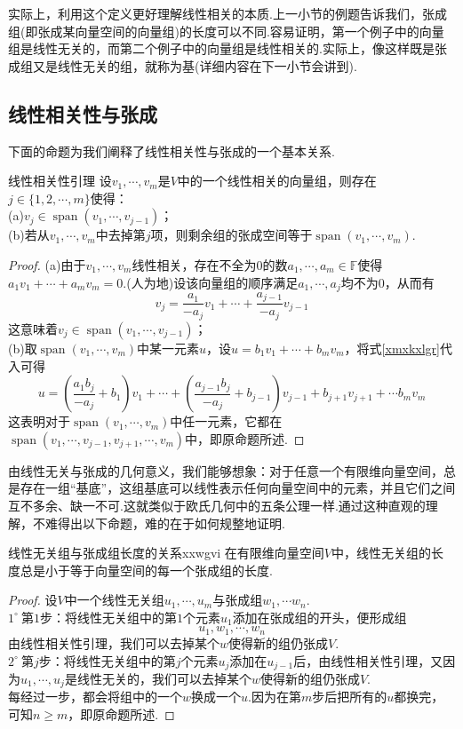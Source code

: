 \documentclass[lang=cn, zihao=5]{elegantbook}
\newcommand{\ssb}[1]{\left( #1 \right)}
\newcommand{\F}{\mathbb{F}}
\newcommand{\buzhou}[1]{$#1^{\circ} \ $}
\DeclareMathOperator{\spn}{span}
\begin{document}
实际上，利用这个定义更好理解线性相关的本质.上一小节的例题告诉我们，张成组(即张成某向量空间的向量组)的长度可以不同.容易证明，第一个例子中的向量组是线性无关的，而第二个例子中的向量组是线性相关的.实际上，像这样既是张成组又是线性无关的组，就称为基(详细内容在下一小节会讲到).


\subsection{线性相关性与张成}

下面的命题为我们阐释了线性相关性与张成的一个基本关系.

\begin{proposition}{线性相关性引理}
	设$v_1, \cdots ,v_m$是$V$中的一个线性相关的向量组，则存在$j \in \{ 1,2, \cdots ,m \}$使得： \\
	(a)$v_j \in \spn (v_1, \cdots , v_{j-1})$； \\
	(b)若从$v_1, \cdots ,v_m$中去掉第$j$项，则剩余组的张成空间等于$\spn (v_1, \cdots ,v_m)$.
\end{proposition}
\begin{proof}
	(a)由于$v_1, \cdots ,v_m$线性相关，存在不全为$0$的数$a_1, \cdots ,a_m \in \F$使得$a_1v_1 + \cdots + a_mv_m = 0$.(人为地)设该向量组的顺序满足$a_1, \cdots ,a_j$均不为$0$，从而有
	\begin{equation}
		v_j = \frac{a_1}{-a_j} v_1 + \cdots + \frac{a_{j-1}}{-a_j} v_{j-1} \label{xmxkxlgr}
	\end{equation}
	这意味着$v_j \in \spn (v_1, \cdots , v_{j-1})$； \\
	(b)取$\spn (v_1, \cdots ,v_m)$中某一元素$u$，设$u=b_1v_1 + \cdots + b_mv_m$，将式\ref{xmxkxlgr}代入可得
	$$u = \ssb{\frac{a_1b_j}{-a_j}+b_1}v_1 + \cdots + \ssb{\frac{a_{j-1}b_j}{-a_j}+b_{j-1}}v_{j-1} + b_{j+1} v_{j+1} + \cdots b_mv_m$$
	这表明对于$\spn (v_1, \cdots ,v_m)$中任一元素，它都在$\spn (v_1, \cdots ,v_{j-1} , v_{j+1}, \cdots ,v_m)$中，即原命题所述.
\end{proof}

由线性无关与张成的几何意义，我们能够想象：对于任意一个有限维向量空间，总是存在一组“基底”，这组基底可以线性表示任何向量空间中的元素，并且它们之间互不多余、缺一不可.这就类似于欧氏几何中的五条公理一样.通过这种直观的理解，不难得出以下命题，难的在于如何规整地证明.

\begin{proposition}{线性无关组与张成组长度的关系}{xxwgvi}
	在有限维向量空间$V$中，线性无关组的长度总是小于等于向量空间的每一个张成组的长度.
\end{proposition}
\begin{proof}
	设$V$中一个线性无关组$u_1, \cdots ,u_m$与张成组$w_1, \cdots w_n$. \\
	\buzhou{1}第$1$步：将线性无关组中的第$1$个元素$u_1$添加在张成组的开头，便形成组$$u_1,w_1, \cdots ,w_n$$
	由线性相关性引理，我们可以去掉某个$w$使得新的组仍张成$V$. \\
	\buzhou{2}第$j$步：将线性无关组中的第$j$个元素$u_j$添加在$u_{j-1}$后，由线性相关性引理，又因为$u_1, \cdots ,u_j$是线性无关的，我们可以去掉某个$w$使得新的组仍张成$V$. \\
	每经过一步，都会将组中的一个$w$换成一个$u$.因为在第$m$步后把所有的$u$都换完，可知$n \geq m$，即原命题所述.
\end{proof}
\end{document}
